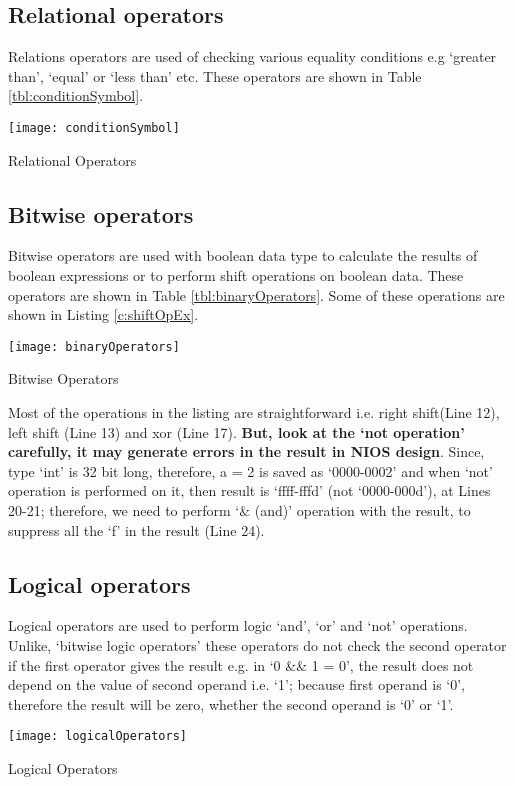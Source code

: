 \subsection{Relational operators}
Relations operators are used of checking various equality conditions e.g `greater than', `equal' or `less than' etc. These operators are shown in Table \ref{tbl:conditionSymbol}. 

\begin{table}[!h]
	\centering
	\texttt{[image: conditionSymbol]}
	\caption{Relational Operators}
	\label{tbl:conditionSymbol}
\end{table}

\subsection{Bitwise operators} 
Bitwise operators are used with boolean data type to calculate the results of boolean expressions or to perform shift operations on boolean data. These operators are shown in Table \ref{tbl:binaryOperators}. Some of these operations are shown in Listing \ref{c:shiftOpEx}. 
\begin{table}[!h]
	\centering
	\texttt{[image: binaryOperators]}
	\caption{Bitwise Operators}
	\label{tbl:binaryOperators}
\end{table}

\begin{explanation}
	Most of the operations in the listing are straightforward i.e. right shift(Line 12), left shift (Line 13) and xor (Line 17). \textbf{But, look at the `not operation' carefully, it may generate errors in the result in NIOS design}. Since, type `int' is 32 bit long, therefore, a = 2 is saved as `0000-0002' and when `not' operation is performed on it, then result is `ffff-fffd' (not `0000-000d'), at Lines 20-21; therefore, we need to perform `$\&$ (and)' operation with the result, to suppress all the `f' in the result (Line 24). 
\end{explanation}


\subsection{Logical operators}
Logical operators are used to perform logic `and', `or' and `not' operations. Unlike, `bitwise logic operators' these operators do not check the second operator if the first operator gives the result e.g. in `0 \&\& 1 = 0', the result does not depend on the value of second operand i.e. `1'; because first operand is `0', therefore the result will be zero, whether the second operand is `0' or `1'.   
\begin{table}[!h]
	\centering
	\texttt{[image: logicalOperators]}
	\caption{Logical Operators}
	\label{tbl:logicalOperators}
\end{table}



